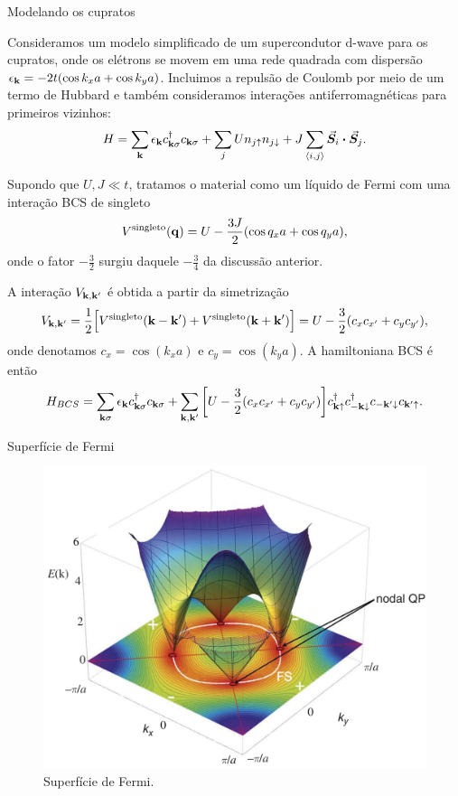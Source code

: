 \documentclass[8pt,aspectratio=169,xcolor={table,dvipsnames,usenames}]{beamer}
\begin{document}

\begin{frame}{Modelando os cupratos}

Consideramos um modelo simplificado de um supercondutor d-wave para os cupratos, onde os elétrons se movem em uma rede quadrada com dispersão $\epsilon_{\vb{k}} = -2t (\cos k_x a + \cos k_y a)$. Incluimos a repulsão de Coulomb por meio de um termo de Hubbard e também consideramos interações antiferromagnéticas para primeiros vizinhos:
$$
H = \sum_{\k} \eps_{\k} c_{\k\s}^\d c_{\k\s} + \sum_{j} U n_{j\up} n_{j\down} + J \sum_{\nn{i}{j}} \va*{S}_i \vdot \va*{S}_j.
$$

Supondo que $U, J \ll t$, tratamos o material como um líquido de Fermi com uma interação BCS de singleto
$$
V^{\text{singleto}}(\vb{q}) = U - \frac{3J}{2} (\cos q_x a + \cos q_y a),
$$
onde o fator $-\frac{3}{2}$ surgiu daquele $-\frac{3}{4}$ da discussão anterior.

A interação $V_{\vb{k},\vb{k}'}$ é obtida a partir da simetrização
$$
V_{\vb{k},\vb{k}'} = \frac{1}{2}
\Big[
V^{\text{singleto}}(\vb{k}-\vb{k}') + V^{\text{singleto}}(\vb{k}+\vb{k}')
\Big] =
U - \frac{3}{2} (c_x c_{x'} + c_y c_{y'}),
$$
onde denotamos $c_x = \cos(k_x a)$ e $c_y = \cos(k_y a)$. A hamiltoniana BCS é então
$$
H_{BCS} = \sum_{\vb{k}\sigma} \epsilon_{\vb{k}} c_{\vb{k}\sigma}^\dagger c_{\vb{k}\sigma} +
\sum_{\vb{k},\vb{k}'} \qty[U - \frac{3}{2} (c_x c_{x'} + c_y c_{y'})]
c_{\vb{k}\uparrow}^\dagger c_{-\vb{k}\downarrow}^\dagger c_{-\vb{k}'\downarrow} c_{\vb{k}'\uparrow}.
$$

\end{frame}


\begin{frame}{Superfície de Fermi}

\begin{figure}[H]
\centering
\includegraphics[width=0.55\linewidth]{fig/fermisurf.png}
\caption{Superfície de Fermi.}
\label{fig:fermisurf}
\end{figure}

\end{frame}
\end{document}
